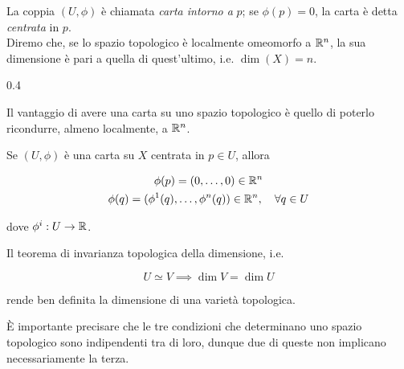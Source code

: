 La coppia $ (U,\phi) $ è chiamata \textit{carta intorno a} $ p $; se $ \phi(p) = 0 $, la carta è detta \textit{centrata} in $ p $.\\
Diremo che, se lo spazio topologico è localmente omeomorfo a $ \mathbb{R}^{n} $, la sua dimensione è pari a quella di quest'ultimo, i.e. $ \dim (X) = n $.

	{0.4}{%
		}

Il vantaggio di avere una carta su uno spazio topologico è quello di poterlo ricondurre, almeno localmente, a $ \mathbb{R}^{n} $.

\begin{remark}
	Se $ (U,\phi) $ è una carta su $ X $ centrata in $ p \in U $, allora
	
	\begin{gather}
		\phi(p) = (0, \dots, 0) \in \R^{n}\\
		\phi(q) = (\phi^{1}(q), \dots, \phi^{n}(q)) \in \R^{n} \qcomma \forall q \in U
	\end{gather}

	dove $ \phi^{i} : U \to \mathbb{R} $.
\end{remark}

\begin{remark}
	Il teorema di invarianza topologica della dimensione, i.e.
	
	\begin{equation}
		U \simeq V \implies \dim V = \dim U
	\end{equation}

	rende ben definita la dimensione di una varietà topologica.
\end{remark}

È importante precisare che le tre condizioni che determinano uno spazio topologico sono indipendenti tra di loro, dunque due di queste non implicano necessariamente la terza.


